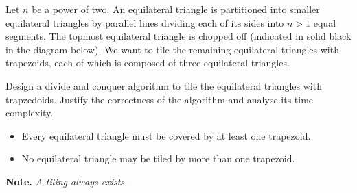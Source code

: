 \documentclass[12pt]{article}
\begin{document}

\begin{question}
Let $n$ be a power of two. An equilateral triangle is partitioned into smaller equilateral triangles by parallel lines dividing each of its sides into $n > 1$ equal segments. The topmost equilateral triangle is chopped off (indicated in solid black in the diagram below). We want to tile the remaining equilateral triangles with trapezoids, each of which is composed of three equilateral triangles.

\begin{figure}[H]
\centering
{}
\label{fig:enter-label}
\end{figure}

Design a divide and conquer algorithm to tile the equilateral triangles with trapzedoids. Justify the correctness of the algorithm and analyse its time complexity.
\begin{itemize}
\item Every equilateral triangle must be covered by at least one trapezoid.
\item No equilateral triangle may be tiled by more than one trapezoid.
\end{itemize}

{\bfseries Note.} {\em A tiling always exists.}
\end{question}
\end{document}
